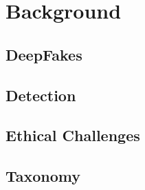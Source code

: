 \section{Background}
\subsection{DeepFakes}
\subsection{Detection}
\subsection{Ethical Challenges}
\subsection{Taxonomy}
